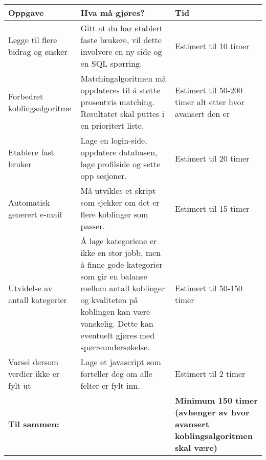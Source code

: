 \begin{table}[H]
    \begin{tabular}{|p{4cm} | p{6cm} | p{4cm} |}
    \hline
    {\bf Oppgave}                               & {\bf Hva må gjøres?}                                                                                                                                                                                                    & {\bf Tid}                                                                        \\ \hline
    Legge til flere bidrag og ønsker      & Gitt at du har etablert faste brukere, vil dette involvere en ny side og en SQL spørring.                                                                                                                         & Estimert til 10 timer                                                      \\ \hline
    Forbedret koblingsalgoritme           & Matchingalgoritmen må oppdateres til å støtte prosentvis matching. Resultatet skal puttes i en prioritert liste.                                                                                                  & Estimert til 50-200 timer alt etter hvor avansert den er                   \\ \hline
    Etablere fast bruker                  & Lage en login-side, oppdatere databasen, lage profilside og sette opp sesjoner.                                                                                                                                   & Estimert til 20 timer                                                      \\ \hline
    Automatisk generert e-mail            & Må utvikles et skript som sjekker om det er flere koblinger som passer.                                                                                                                                           & Estimert til 15 timer                                                      \\ \hline
    Utvidelse av antall kategorier        & Å lage kategoriene er ikke en stor jobb, men å finne gode kategorier som gir en balanse mellom antall koblinger og kvaliteten på koblingen kan være vanskelig. Dette kan eventuelt gjøres med spørreundersøkelse. & Estimert til 50-150 timer                                                  \\ \hline
    Varsel dersom verdier ikke er fylt ut & Lage et javascript som forteller deg om alle felter er fylt inn.                                                                                                                                                  & Estimert til 2 timer                                                       \\ \hline
    {\bf Til sammen:}                           & ~                                                                                                                                                                                                                 & {\bf Minimum 150 timer (avhenger av hvor avansert koblingsalgoritmen skal være)} \\ \hline
    \end{tabular}
\end{table}

